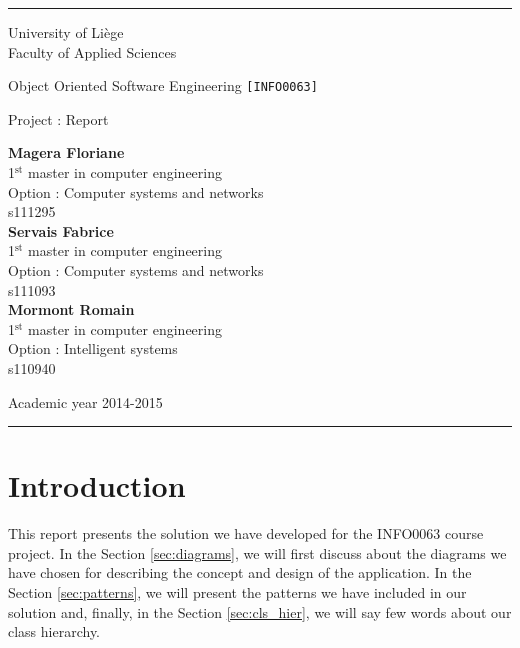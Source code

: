 \documentclass[a4paper,11pt]{article}
\begin{document}
\rule{1\linewidth}{1px}
{ \sc
\begin{center}
{\small University of Liège}\\
{\small Faculty of Applied Sciences}

\end{center}

\vfill
\begin{center}

{\Huge Object Oriented Software Engineering {\LARGE \tt [INFO0063]}\\}
\end{center}
\begin{center}
{\Huge Project : Report}
\end{center}
\begin{center}
\textbf{Magera Floriane}\\
{\small 1$^{\text{st}}$ master in computer engineering}\\
{\small Option : Computer systems and networks}\\
{\small s111295}\\
\vspace{0.5cm}
\textbf{Servais Fabrice}\\
{\small 1$^{\text{st}}$ master in computer engineering}\\
{\small Option : Computer systems and networks}\\
{\small s111093}\\
\vspace{0.5cm}
\textbf{Mormont Romain}\\
{\small 1$^{\text{st}}$ master in computer engineering}\\
{\small Option : Intelligent systems}\\
{\small s110940}
\end{center}

\vfill
\begin{center}
Academic year 2014-2015\\
\end{center}
}
\rule{1\linewidth}{1px}
\newpage
\tableofcontents
\newpage

\section{Introduction}

This report presents the solution we have developed for the INFO0063 course project. In the Section \ref{sec:diagrams}, we will first discuss about the diagrams we have chosen for describing the concept and design of the application. In the Section \ref{sec:patterns}, we will present the patterns we have included in our solution and, finally, in the Section \ref{sec:cls_hier}, we will say few words about our class hierarchy.
\end{document}
